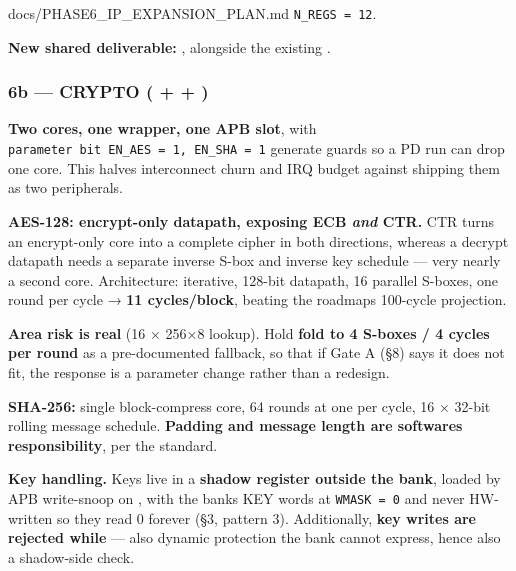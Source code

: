 \begin{relocated}{docs/PHASE6_IP_EXPANSION_PLAN.md}
\texttt{N\_\allowbreak{}REGS\ =\allowbreak{}\ 12}.

\textbf{New shared deliverable:} ,
alongside the existing .

\subsubsection{\texorpdfstring{6b --- CRYPTO
( +  +
)}{6b --- CRYPTO ( +  + )}}\label{ds:ch:phase6-ip-expansion-plan:6b-crypto-rtlperiphcrypto-accelsv-aes128-coresv-sha256-coresv}

\textbf{Two cores, one wrapper, one APB slot}, with
\texttt{parameter\ bit\ EN\_\allowbreak{}AES\ =\allowbreak{}\ 1,\allowbreak{}\ EN\_\allowbreak{}SHA\ =\allowbreak{}\ 1}
generate guards so a PD run can drop one core. This halves interconnect
churn and IRQ budget against shipping them as two peripherals.

\textbf{AES-128: encrypt-only datapath, exposing ECB \emph{and} CTR.}
CTR turns an encrypt-only core into a complete cipher in both
directions, whereas a decrypt datapath needs a separate inverse S-box
and inverse key schedule --- very nearly a second core. Architecture:
iterative, 128-bit datapath, 16 parallel S-boxes, one round per cycle →
\textbf{11 cycles/\allowbreak{}block}, beating the
roadmap\textquotesingle s 100-cycle projection.

\warn{} \textbf{Area risk is real} (16 × 256×8 lookup). Hold
\textbf{fold to 4 S-boxes / 4 cycles per round} as a pre-documented
fallback, so that if Gate A (§8) says it does not fit, the response is a
parameter change rather than a redesign.

\textbf{SHA-256:} single block-compress core, 64 rounds at one per
cycle, 16 × 32-bit rolling message schedule. \textbf{Padding and message
length are software\textquotesingle s responsibility}, per the standard.

\textbf{Key handling.} Keys live in a \textbf{shadow register outside
the bank}, loaded by APB write-snoop on , with the
bank\textquotesingle s KEY words at \texttt{WMASK\ =\allowbreak{}\ 0}
and never HW-written so they read 0 forever (§3, pattern 3).
Additionally, \textbf{key writes are rejected while }
--- also dynamic protection the bank cannot express, hence also a
shadow-side check.

{\small\setlength{\tabcolsep}{4pt}

}
\end{relocated}
